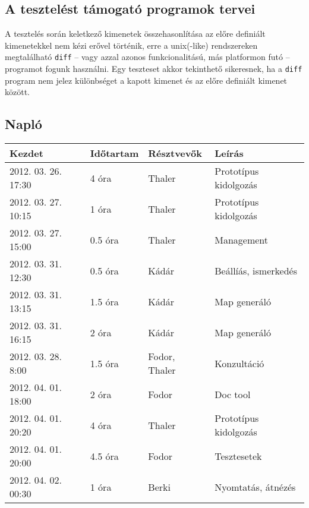 	\subsection{A tesztelést támogató programok tervei}
		A tesztelés során keletkező kimenetek összehasonlítása az előre definiált kimenetekkel nem kézi erővel történik, erre a unix(-like) rendszereken megtalálható \texttt{diff} -- vagy azzal azonos funkcionalitású, más platformon futó -- programot fogunk használni. Egy teszteset akkor tekinthető sikeresnek, ha a \texttt{diff} program nem jelez különbséget a kapott kimenet és az előre definiált kimenet között.


	\subsection{Napló}
    \begin{center} 
        \begin{tabular}{| l | p{1.9cm} | p{2.6cm} | p{6.1cm} |}
            \hline
                Kezdet & Időtartam & Résztvevők & Leírás \\
            \hline \hline 
2012. 03. 26. 17:30 & 4 óra & Thaler & Prototípus kidolgozás\\ \hline
2012. 03. 27. 10:15 & 1 óra & Thaler & Prototípus kidolgozás\\ \hline
2012. 03. 27. 15:00 & 0.5 óra & Thaler & Management\\ \hline
2012. 03. 31. 12:30 & 0.5 óra & Kádár & Beállíás, ismerkedés\\ \hline
2012. 03. 31. 13:15 & 1.5 óra & Kádár & Map generáló\\ \hline
2012. 03. 31. 16:15 & 2 óra & Kádár & Map generáló\\ \hline
2012. 03. 28. 8:00 & 1.5 óra & Fodor, Thaler & Konzultáció\\ \hline
2012. 04. 01. 18:00 & 2 óra & Fodor & Doc tool\\ \hline
2012. 04. 01. 20:20 & 4 óra & Thaler & Prototípus kidolgozás\\ \hline
2012. 04. 01. 20:00 & 4.5 óra & Fodor & Tesztesetek\\ \hline
2012. 04. 02. 00:30 & 1 óra & Berki & Nyomtatás, átnézés\\ \hline

            \hline
        \end{tabular}
    \end{center}

